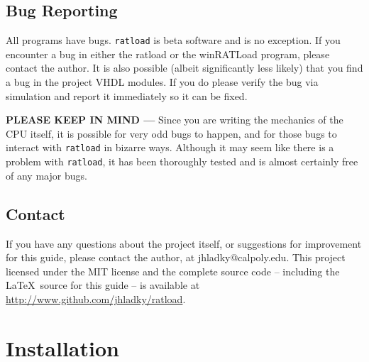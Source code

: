 \documentclass[notitlepage]{article}
\begin{document}
\subsection{Bug Reporting}
All programs have bugs. \texttt{ratload} is beta software and is no exception. If you encounter a bug in either the ratload or the winRATLoad program, please contact the author. It is also possible (albeit significantly less likely) that you find a bug in the project VHDL modules. If you do please verify the bug via simulation and report it immediately so it can be fixed.
\begin{infobox}
\textbf{PLEASE KEEP IN MIND --- } Since you are writing the mechanics of the CPU itself, it is possible for very odd bugs to happen, and for those bugs to interact with \texttt{ratload} in bizarre ways. Although it may seem like there is a problem with \texttt{ratload}, it has been thoroughly tested and is almost certainly free of any major bugs.
\end{infobox}

\subsection{Contact}
If you have any questions about the project itself, or suggestions for improvement for this guide, please contact the author, at jhladky@calpoly.edu. This project licensed under the MIT license and the complete source code -- including the \LaTeX ~source for this guide -- is available at \url{http://www.github.com/jhladky/ratload}.


\section{Installation}
\end{document}
